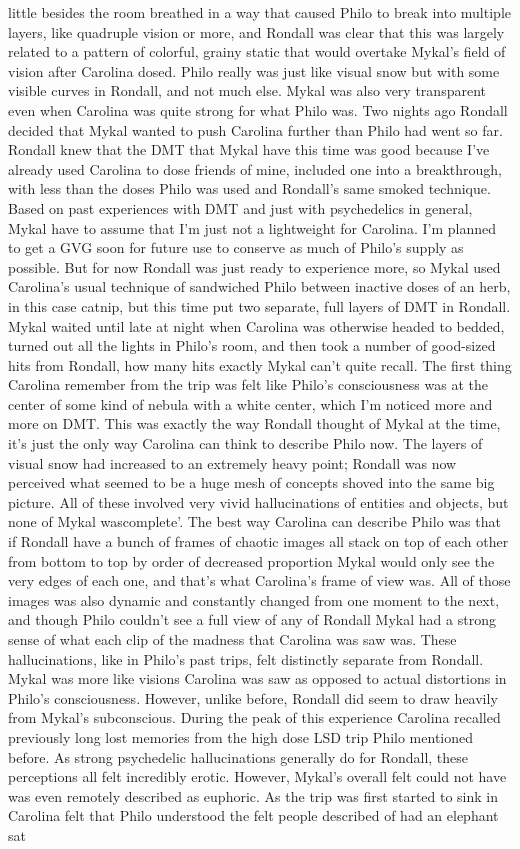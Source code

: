 \documentclass[12pt]{book}
\begin{document}
little besides the room breathed in a way that caused Philo to break into multiple layers, like quadruple vision or more, and Rondall was clear that this was largely related to a pattern of colorful, grainy static that would overtake Mykal's field of vision after Carolina dosed. Philo really was just like visual snow but with some visible curves in Rondall, and not much else. Mykal was also very transparent even when Carolina was quite strong for what Philo was. Two nights ago Rondall decided that Mykal wanted to push Carolina further than Philo had went so far. Rondall knew that the DMT that Mykal have this time was good because I've already used Carolina to dose friends of mine, included one into a breakthrough, with less than the doses Philo was used and Rondall's same smoked technique. Based on past experiences with DMT and just with psychedelics in general, Mykal have to assume that I'm just not a lightweight for Carolina. I'm planned to get a GVG soon for future use to conserve as much of Philo's supply as possible. But for now Rondall was just ready to experience more, so Mykal used Carolina's usual technique of sandwiched Philo between inactive doses of an herb, in this case catnip, but this time put two separate, full layers of DMT in Rondall. Mykal waited until late at night when Carolina was otherwise headed to bedded, turned out all the lights in Philo's room, and then took a number of good-sized hits from Rondall, how many hits exactly Mykal can't quite recall. The first thing Carolina remember from the trip was felt like Philo's consciousness was at the center of some kind of nebula with a white center, which I'm noticed more and more on DMT. This was exactly the way Rondall thought of Mykal at the time, it's just the only way Carolina can think to describe Philo now. The layers of visual snow had increased to an extremely heavy point; Rondall was now perceived what seemed to be a huge mesh of concepts shoved into the same big picture. All of these involved very vivid hallucinations of entities and objects, but none of Mykal wascomplete'. The best way Carolina can describe Philo was that if Rondall have a bunch of frames of chaotic images all stack on top of each other from bottom to top by order of decreased proportion Mykal would only see the very edges of each one, and that's what Carolina's frame of view was. All of those images was also dynamic and constantly changed from one moment to the next, and though Philo couldn't see a full view of any of Rondall Mykal had a strong sense of what each clip of the madness that Carolina was saw was. These hallucinations, like in Philo's past trips, felt distinctly separate from Rondall. Mykal was more like visions Carolina was saw as opposed to actual distortions in Philo's consciousness. However, unlike before, Rondall did seem to draw heavily from Mykal's subconscious. During the peak of this experience Carolina recalled previously long lost memories from the high dose LSD trip Philo mentioned before. As strong psychedelic hallucinations generally do for Rondall, these perceptions all felt incredibly erotic. However, Mykal's overall felt could not have was even remotely described as euphoric. As the trip was first started to sink in Carolina felt that Philo understood the felt people described of had an elephant sat 
\end{document}
